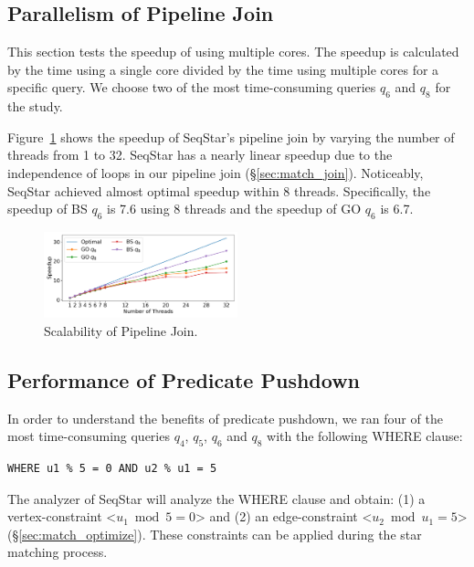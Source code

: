 \subsection{Parallelism of Pipeline Join}\label{sec:experiments_join}
This section tests the speedup of using multiple cores. The speedup is calculated by the time using a single core divided by the time using multiple cores for a specific query.
We choose two of the most time-consuming queries $q_6$ and $q_8$ for the study.

Figure~\ref{img:exp_scalability} shows the speedup of SeqStar's pipeline join by varying the number of threads from 1 to 32.
SeqStar has a nearly linear speedup due to the independence of loops in our pipeline join (\S\ref{sec:match_join}).
Noticeably, SeqStar achieved almost optimal speedup within 8 threads.
Specifically, the speedup of BS $q_6$ is 7.6 using 8 threads and the speedup of GO $q_6$ is 6.7.
\begin{figure}[ht]
  \centering
  \includegraphics[width=0.5\textwidth]{img/exp_scalability.pdf}
  \caption{Scalability of Pipeline Join.}\label{img:exp_scalability}
\end{figure}

\subsection{Performance of Predicate Pushdown}
In order to understand the benefits of predicate pushdown,
we ran four of the most time-consuming queries $q_4$, $q_5$, $q_6$ and $q_8$ with the following WHERE clause:
\begin{Verbatim}[fontsize=\small]
  WHERE u1 % 5 = 0 AND u2 % u1 = 5
\end{Verbatim}
The analyzer of SeqStar will analyze the WHERE clause and obtain:
(1) a vertex-constraint <$u_1 \bmod 5 = 0$> and (2) an edge-constraint <$u_2 \bmod u_1 = 5$> (\S\ref{sec:match_optimize}).
These constraints can be applied during the star matching process.

